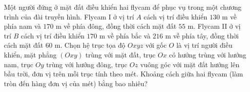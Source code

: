 \begin{vd}%
	Một người đứng ở mặt đất điều khiển hai flycam để phục vụ trong một chương trình của đài truyền hình. Flycam I ở vị trí $A$ cách vị trí điều khiển $130$ m về phía nam và $170$ m về phía đông, đồng thời cách mặt đất $55$ m. Flycam II ở vị trí $B$ cách vị trí điều khiển $170$ m về phía bắc và $216$ m về phía tây, đồng thời cách mặt đất $60$ m. Chọn hệ trục tọa độ $Oxyz$ với gốc $O$ là vị trí người điều khiển, mặt phẳng $(Oxy)$ trùng với mặt đất, trục $Ox$ có hướng trùng với hướng nam, trục $Oy$ trùng với hướng đông, trục $Oz$ vuông góc với mặt đất hướng lên bầu trời, đơn vị trên mỗi trục tính theo mét. Khoảng cách giữa hai flycam (làm tròn đến hàng đơn vị của mét) bằng bao nhiêu?
\end{vd}
